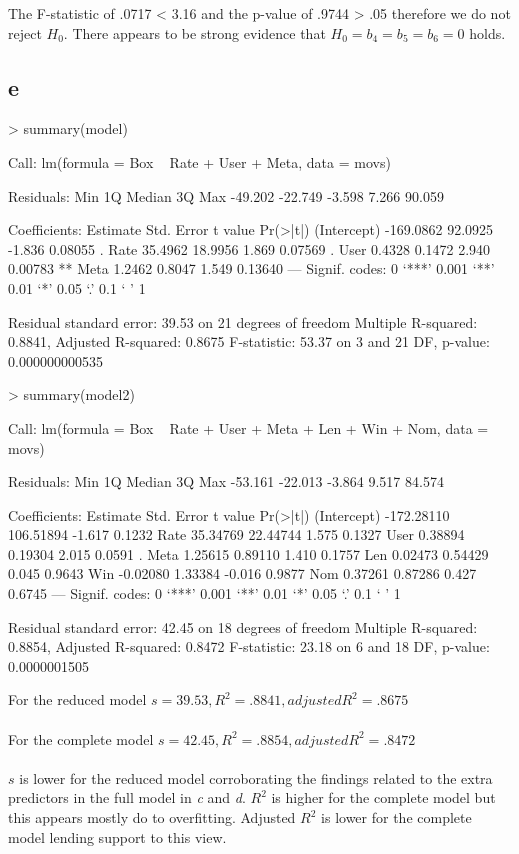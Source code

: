 \documentclass{article}
\begin{document}
The F-statistic of .0717 < 3.16 and the p-value of .9744 > .05 therefore we do not reject $H_0$. There appears to be strong evidence that $H_0 = b_4 = b_5 = b_6 = 0$ holds. 

\subsection*{e}
\begin{Schunk}
\begin{Sinput}
> summary(model)
\end{Sinput}
\begin{Soutput}
Call:
lm(formula = Box ~ Rate + User + Meta, data = movs)

Residuals:
    Min      1Q  Median      3Q     Max 
-49.202 -22.749  -3.598   7.266  90.059 

Coefficients:
             Estimate Std. Error t value Pr(>|t|)   
(Intercept) -169.0862    92.0925  -1.836  0.08055 . 
Rate          35.4962    18.9956   1.869  0.07569 . 
User           0.4328     0.1472   2.940  0.00783 **
Meta           1.2462     0.8047   1.549  0.13640   
---
Signif. codes:  0 ‘***’ 0.001 ‘**’ 0.01 ‘*’ 0.05 ‘.’ 0.1 ‘ ’ 1

Residual standard error: 39.53 on 21 degrees of freedom
Multiple R-squared:  0.8841,	Adjusted R-squared:  0.8675 
F-statistic: 53.37 on 3 and 21 DF,  p-value: 0.000000000535
\end{Soutput}
\begin{Sinput}
> summary(model2)
\end{Sinput}
\begin{Soutput}
Call:
lm(formula = Box ~ Rate + User + Meta + Len + Win + Nom, data = movs)

Residuals:
    Min      1Q  Median      3Q     Max 
-53.161 -22.013  -3.864   9.517  84.574 

Coefficients:
              Estimate Std. Error t value Pr(>|t|)  
(Intercept) -172.28110  106.51894  -1.617   0.1232  
Rate          35.34769   22.44744   1.575   0.1327  
User           0.38894    0.19304   2.015   0.0591 .
Meta           1.25615    0.89110   1.410   0.1757  
Len            0.02473    0.54429   0.045   0.9643  
Win           -0.02080    1.33384  -0.016   0.9877  
Nom            0.37261    0.87286   0.427   0.6745  
---
Signif. codes:  0 ‘***’ 0.001 ‘**’ 0.01 ‘*’ 0.05 ‘.’ 0.1 ‘ ’ 1

Residual standard error: 42.45 on 18 degrees of freedom
Multiple R-squared:  0.8854,	Adjusted R-squared:  0.8472 
F-statistic: 23.18 on 6 and 18 DF,  p-value: 0.0000001505
\end{Soutput}
\end{Schunk}

For the reduced model $s=39.53, R^2=.8841, adjusted R^2=.8675$
\\\\
For the complete model $s=42.45, R^2=.8854, adjusted R^2=.8472$
\\\\
$s$ is lower for the reduced model corroborating the findings related to the extra predictors in the full model in \textit{c} and \textit{d}. $R^2$ is higher for the complete model but this appears mostly do to overfitting. Adjusted $R^2$ is lower for the complete model lending support to this view.  
\end{document}
